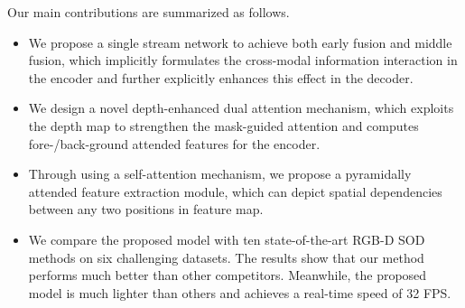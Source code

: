 \documentclass[runningheads]{llncs}
\begin{document}
Our main contributions are summarized as follows.
\begin{itemize}
     \item We propose a single stream network  to achieve both early fusion and middle fusion, which implicitly formulates the cross-modal information interaction in the encoder and further explicitly enhances this effect in the decoder. 
     
    \item We design a novel depth-enhanced dual attention mechanism, which exploits the depth map to  strengthen the mask-guided attention and computes fore-/back-ground attended features for the encoder.
    
    \item Through using a self-attention mechanism, we propose a  pyramidally attended feature extraction module, which can depict spatial dependencies between any two positions in feature map.
    
    \item We compare the proposed model with ten state-of-the-art RGB-D SOD methods on six challenging datasets. The results show that our method performs much better than other competitors. Meanwhile, the proposed model is much lighter than others and achieves a real-time speed of 32 FPS.    
\end{itemize}
\end{document}
